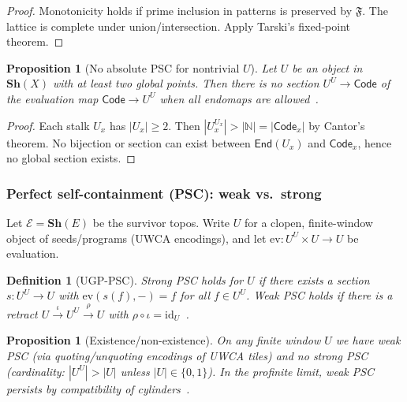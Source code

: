 \documentclass[12pt]{article}
\newtheorem{proposition}[theorem]{Proposition}
\newtheorem{definition}[theorem]{Definition}
\numberwithin{equation}{section}
\begin{document}
\begin{proof}
Monotonicity holds if prime inclusion in patterns is preserved by $\mathfrak{F}$. The lattice is complete under union/intersection. Apply Tarski's fixed-point theorem.
\end{proof}

\begin{proposition}[No absolute PSC for nontrivial $U$]\label{prop:no-absolute-psc}
Let $U$ be an object in $\mathbf{Sh}(X)$ with at least two global points. Then there is no section $U^U \to \mathsf{Code}$ of the evaluation map $\mathsf{Code} \to U^U$ when all endomaps are allowed~\cite{SpivackUGPFormalization,ugp-lean}.
\end{proposition}

\begin{proof}
Each stalk $U_x$ has $|U_x| \ge 2$. Then $|U_x^{U_x}| > |\mathbb{N}| = |\mathsf{Code}_x|$ by Cantor's theorem. No bijection or section can exist between $\mathsf{End}(U_x)$ and $\mathsf{Code}_x$, hence no global section exists.
\end{proof}

\subsubsection{Perfect self-containment (PSC): weak vs.\ strong}\label{subsec:psc}
Let $\mathcal{E}=\mathbf{Sh}(E)$ be the survivor topos. Write $U$ for a clopen, finite-window object of seeds/programs (UWCA encodings), and let $\mathrm{ev}:U^U\times U\to U$ be evaluation.

\begin{definition}[UGP-PSC]
\emph{Strong PSC} holds for $U$ if there exists a section $s:U^U\to U$ with $\mathrm{ev}(s(f),-)=f$ for all $f\in U^U$. \emph{Weak PSC} holds if there is a retract $U \xrightarrow{\iota} U^U \xrightarrow{\rho} U$ with $\rho\circ\iota=\mathrm{id}_U$~\cite{SpivackUGPFormalization,ugp-lean}.
\end{definition}

\begin{proposition}[Existence/non-existence]\label{prop:psc}
On any finite window $U$ we have weak PSC (via quoting/unquoting encodings of UWCA tiles) and \emph{no} strong PSC (cardinality: $|U^U|>|U|$ unless $|U|\in\{0,1\}$). In the profinite limit, weak PSC persists by compatibility of cylinders~\cite{SpivackUGPFormalization,ugp-lean}.
\end{proposition}
\end{document}
